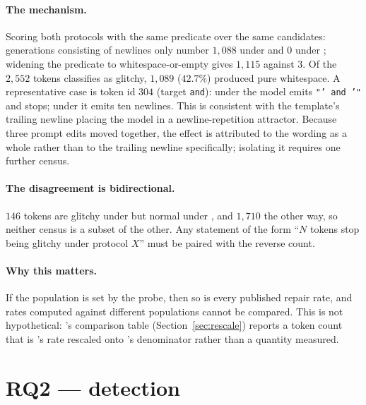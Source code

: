 \paragraph{The mechanism.} Scoring both protocols with the same predicate over the
same candidates: generations consisting of newlines only number $1{,}088$ under
\Pcode{} and $0$ under \Ppaper{}; widening the predicate to whitespace-or-empty
gives $1{,}115$ against $3$. Of the $2{,}552$ tokens \Pcode{} classifies as
glitchy, $1{,}089$ ($42.7\%$) produced pure whitespace. A representative case is
token id $304$ (target \texttt{and}): under \Ppaper{} the model emits
\texttt{"' and '"} and stops; under \Pcode{} it emits ten newlines. This is
consistent with the template's trailing newline placing the model in a
newline-repetition attractor. Because three prompt edits moved together, the
effect is attributed to the wording as a whole rather than to the trailing
newline specifically; isolating it requires one further census.

\paragraph{The disagreement is bidirectional.} $146$ tokens are glitchy under
\Ppaper{} but normal under \Pcode{}, and $1{,}710$ the other way, so neither
census is a subset of the other. Any statement of the form ``$N$ tokens stop
being glitchy under protocol $X$'' must be paired with the reverse count.

\paragraph{Why this matters.} If the population is set by the probe, then so is
every published repair rate, and rates computed against different populations
cannot be compared. This is not hypothetical: \gc{}'s comparison table
(Section~\ref{sec:rescale}) reports a \gp{} token count that is \gp{}'s rate
rescaled onto \gc{}'s denominator rather than a quantity \gp{} measured.

\section{RQ2 --- \gp{} detection}
\label{sec:rq2}

